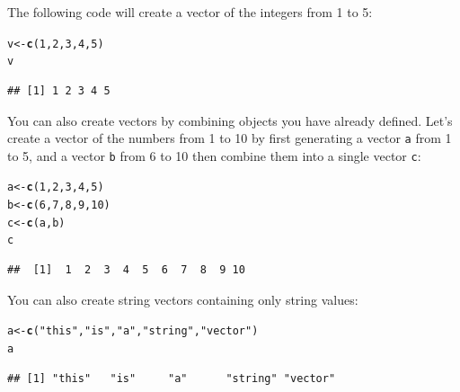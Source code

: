 \documentclass{tufte-book}\usepackage[]{graphicx}\usepackage[]{color}
\makeatletter
\newcommand{\hlnum}[1]{\textcolor[rgb]{0.686,0.059,0.569}{#1}}%
\newcommand{\hlstr}[1]{\textcolor[rgb]{0.192,0.494,0.8}{#1}}%
\newcommand{\hlstd}[1]{\textcolor[rgb]{0.345,0.345,0.345}{#1}}%
\newcommand{\hlkwb}[1]{\textcolor[rgb]{0.69,0.353,0.396}{#1}}%
\newcommand{\hlkwd}[1]{\textcolor[rgb]{0.737,0.353,0.396}{\textbf{#1}}}%
\newenvironment{kframe}{%
 \def\at@end@of@kframe{}%
 \ifinner\ifhmode%
  \def\at@end@of@kframe{\end{minipage}}%
  \begin{minipage}{\columnwidth}%
 \fi\fi%
 \def\FrameCommand##1{\hskip\@totalleftmargin \hskip-\fboxsep
 \colorbox{shadecolor}{##1}\hskip-\fboxsep
     \hskip-\linewidth \hskip-\@totalleftmargin \hskip\columnwidth}%
 \MakeFramed {\advance\hsize-\width
   \@totalleftmargin\z@ \linewidth\hsize
   \@setminipage}}%
 {\par\unskip\endMakeFramed%
 \at@end@of@kframe}
\newenvironment{knitrout}{}{} %
\makeatother
\begin{document}

The following code will create a vector of the integers from 1 to 5:

\begin{knitrout}
\color{fgcolor}\begin{kframe}
\begin{alltt}
\hlstd{v} \hlkwb{<-} \hlkwd{c}\hlstd{(}\hlnum{1}\hlstd{,} \hlnum{2}\hlstd{,} \hlnum{3}\hlstd{,} \hlnum{4}\hlstd{,} \hlnum{5}\hlstd{)}
\hlstd{v}
\end{alltt}
\begin{verbatim}
## [1] 1 2 3 4 5
\end{verbatim}
\end{kframe}
\end{knitrout}

You can also create vectors by combining objects you have already defined. Let's create a vector of the numbers from 1 to 10 by first generating a vector \texttt{a} from 1 to 5, and a vector \texttt{b} from 6 to 10 then combine them into a single vector \texttt{c}:

\begin{knitrout}
\color{fgcolor}\begin{kframe}
\begin{alltt}
\hlstd{a} \hlkwb{<-} \hlkwd{c}\hlstd{(}\hlnum{1}\hlstd{,} \hlnum{2}\hlstd{,} \hlnum{3}\hlstd{,} \hlnum{4}\hlstd{,} \hlnum{5}\hlstd{)}
\hlstd{b} \hlkwb{<-} \hlkwd{c}\hlstd{(}\hlnum{6}\hlstd{,} \hlnum{7}\hlstd{,} \hlnum{8}\hlstd{,} \hlnum{9}\hlstd{,} \hlnum{10}\hlstd{)}
\hlstd{c} \hlkwb{<-} \hlkwd{c}\hlstd{(a, b)}
\hlstd{c}
\end{alltt}
\begin{verbatim}
##  [1]  1  2  3  4  5  6  7  8  9 10
\end{verbatim}
\end{kframe}
\end{knitrout}

You can also create string vectors containing only string values:

\begin{knitrout}
\color{fgcolor}\begin{kframe}
\begin{alltt}
\hlstd{a} \hlkwb{<-} \hlkwd{c}\hlstd{(}\hlstr{"this"}\hlstd{,} \hlstr{"is"}\hlstd{,} \hlstr{"a"}\hlstd{,} \hlstr{"string"}\hlstd{,} \hlstr{"vector"}\hlstd{)}
\hlstd{a}
\end{alltt}
\begin{verbatim}
## [1] "this"   "is"     "a"      "string" "vector"
\end{verbatim}
\end{kframe}
\end{knitrout}
\end{document}
